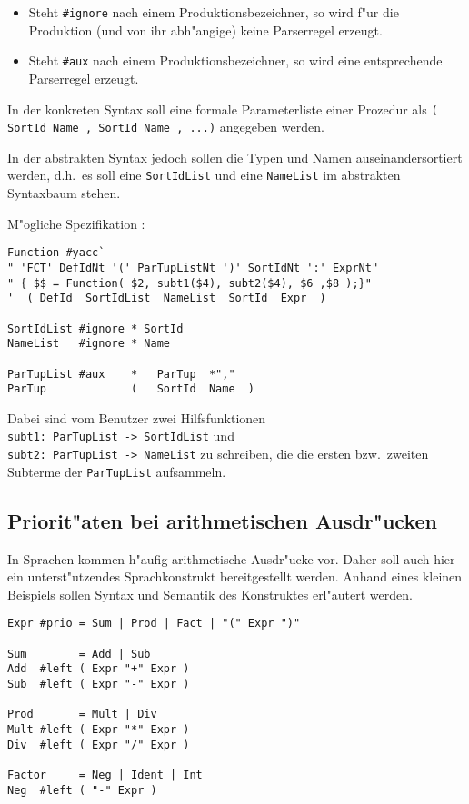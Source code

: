 \begin{itemize}
\item
Steht {\tt \#ignore} nach einem Produktionsbezeichner, so wird
f"ur die Produktion (und von ihr abh"angige) keine Parserregel erzeugt.
\item
Steht {\tt \#aux} nach einem Produktionsbezeichner, so wird eine
entsprechende Parserregel erzeugt.
\end{itemize}


\medskip\noindent
In der konkreten Syntax soll eine formale Parameterliste einer Prozedur
als {\tt ( SortId Name , SortId Name , ...)} angegeben werden.

In der abstrakten Syntax jedoch sollen die Typen und Namen auseinandersortiert
werden, d.h.\ es soll eine {\tt SortIdList} und eine {\tt NameList} 
im abstrakten Syntaxbaum stehen.

\noindent M"ogliche Spezifikation :

\begin{verbatim}
Function #yacc`
" 'FCT' DefIdNt '(' ParTupListNt ')' SortIdNt ':' ExprNt"
" { $$ = Function( $2, subt1($4), subt2($4), $6 ,$8 );}"
'  ( DefId  SortIdList  NameList  SortId  Expr  )

SortIdList #ignore * SortId
NameList   #ignore * Name

ParTupList #aux    *   ParTup  *","
ParTup             (   SortId  Name  )
\end{verbatim}

\noindent
Dabei sind vom Benutzer zwei Hilfsfunktionen\\
{\tt subt1: ParTupList -> SortIdList} \enspace und\\
{\tt subt2: ParTupList -> NameList} \quad zu schreiben, die die ersten
bzw.\ zweiten Subterme der {\tt ParTupList} aufsammeln.




\subsection{Priorit"aten bei arithmetischen Ausdr"ucken}

In Sprachen kommen h"aufig arithmetische Ausdr"ucke vor. Daher soll auch
hier ein unterst"utzendes Sprachkonstrukt bereitgestellt werden.
Anhand eines kleinen Beispiels sollen Syntax und Semantik des
Konstruktes erl"autert werden.

\begin{verbatim}
Expr #prio = Sum | Prod | Fact | "(" Expr ")"

Sum        = Add | Sub
Add  #left ( Expr "+" Expr )
Sub  #left ( Expr "-" Expr )

Prod       = Mult | Div
Mult #left ( Expr "*" Expr )
Div  #left ( Expr "/" Expr )

Factor     = Neg | Ident | Int
Neg  #left ( "-" Expr )
\end{verbatim}

